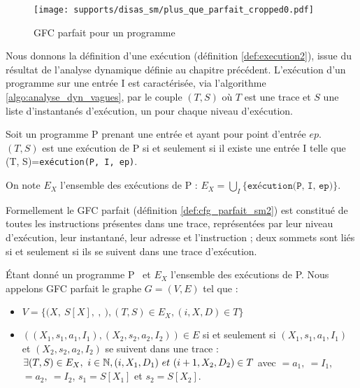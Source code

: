 \begin{figure}[h]
\begin{center}
  \texttt{[image: supports/disas\_sm/plus\_que\_parfait\_cropped0.pdf]}
\end{center}
\caption{GFC parfait pour un programme \sm}
\label{fig:sm_cfg_parfait_sm}
\end{figure}

Nous donnons la définition d'une exécution (définition \ref{def:execution2}), issue du résultat de l'analyse dynamique définie au chapitre précédent. L'exécution d'un programme sur une entrée I est caractérisée, via l'algorithme \ref{algo:analyse_dyn_vagues}, par le couple $(T, S)$ où $T$ est une trace et $S$ une liste d'instantanés d'exécution, un pour chaque niveau d'exécution.

\begin{defi}
 Soit un programme P prenant une entrée et ayant pour point d'entrée $ep$.
 $(T, S)$ est une exécution de P si et seulement si il existe une entrée I telle que (T, S)=\texttt{exécution(P, I, ep)}.

 On note $E_X$ l'ensemble des exécutions de P : $E_X=\bigcup_I\{\texttt{exécution(P, I, ep)}\}$.
\label{def:execution2}
\end{defi}


Formellement le GFC parfait (définition \ref{def:cfg_parfait_sm2}) est constitué de toutes les instructions présentes dans une trace, représentées par leur niveau d'exécution, leur instantané, leur adresse et l'instruction ; deux sommets sont liés si et seulement si ils se suivent dans une trace d'exécution.

\begin{defi}
 Étant donné un programme P \sm\ et $E_X$ l'ensemble des exécutions de P.
 Nous appelons GFC parfait le graphe $G=(V, E)$ tel que :
 \begin{itemize}
  \item $V=\{(X,\ S[X],\ $$,\ $$), (T, S)\in E_X, (i, X, D)\in T\}$%
  \item $((X_1, s_1, a_1, I_1), (X_2, s_2, a_2, I_2))\in E$ si et seulement si $(X_1, s_1, a_1,
I_1)$ et $(X_2, s_2, a_2, I_2)$ se suivent dans une trace : $\exists (T, S)\in
E_X,\ i\in \mathbb N, (i, X_1, D_1)\ et\ (i+1, X_2, D_2)\in T$ avec $=a_1,\ $$=I_1,$~$=a_2,\ $$=I_2$, $s_1=S[X_1]$ et $s_2=S[X_2]$.
 \end{itemize}
\label{def:cfg_parfait_sm2}
\end{defi}

